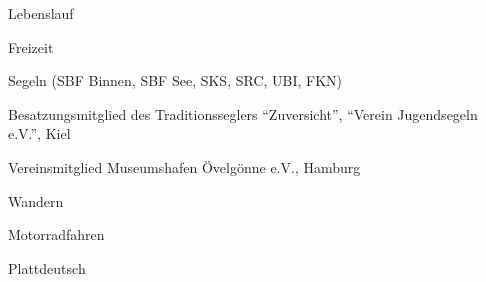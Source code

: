 \documentclass[11pt,a4paper]{scrartcl}
\begin{document}
\begin{cv}{Lebenslauf}
\begin{cvlist}{Freizeit}
\item Segeln (SBF Binnen, SBF See, SKS, SRC, UBI, FKN)
\item Besatzungsmitglied des Traditionsseglers "`Zuversicht"', "`Verein
Jugendsegeln e.V."', Kiel
\item Vereinsmitglied Museumshafen \"Ovelg\"onne e.V., Hamburg
\item Wandern
\item Motorradfahren
\item Plattdeutsch
\end{cvlist}


\date{\today}

\end{cv}

\newpage
\end{document}
